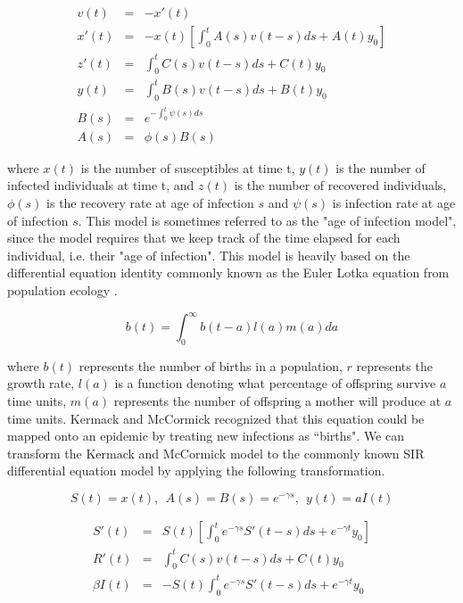 \documentclass{umassthesis}          %
\begin{document}
\begin{eqnarray}
  v(t) &=& -x'(t) \\ 
  x'(t) &=& -x(t)\left[ \int_0^t A(s) v(t-s)ds + A(t) y_0 \right] \\
  z'(t) &=& \int_0^t C(s)v(t-s)ds + C(t)y_0\\
  y(t) &=& \int_0^t B(s)v(t-s)ds + B(t) y_0\\
  B(s) &=& e^{-\int_0^t \psi(s)ds}\\
  A(s) &=& \phi(s)B(s)
\end{eqnarray}

where $x(t)$ is the number of susceptibles at time t, $y(t)$ is the number of infected individuals at time t, and $z(t)$ is the number of recovered individuals, $\phi(s)$ is the recovery rate at age of infection $s$ and $\psi(s)$ is infection rate at age of infection $s$. This model is sometimes referred to as the "age of infection model", since the model requires that we keep track of the time elapsed for each individual, i.e. their "age of infection". This model is heavily based on the differential equation identity commonly known as the Euler Lotka equation from population ecology \cite{wallinga2007generation}. 

\begin{equation}
  b(t) =\int_0^\infty b(t-a)l(a)m(a) da
\end{equation}

where $b(t)$ represents the number of births in a population, $r$ represents the growth rate, $l(a)$ is a function denoting what percentage of offspring survive $a$ time units, $m(a)$ represents the number of offspring a mother will produce at $a$ time units. Kermack and McCormick recognized that this equation could be mapped onto an epidemic by treating new infections as ``births".  We can transform the Kermack and McCormick model to the commonly known SIR differential equation model by applying the following transformation.

\begin{equation}
S(t) = x(t) , \ \ A(s)= B(s) = e^{-\gamma s}, \ \ y(t) =  aI(t)
\end{equation}


\begin{eqnarray}
  S'(t) &=& S(t)\left[ \int_0^t e^{-\gamma s}S'(t-s)ds + e^{-\gamma t} y_0 \right] \\
  R'(t) &=& \int_0^t C(s)v(t-s)ds + C(t)y_0\\
 \beta I (t) &=& -S(t)\int_0^t e^{-\gamma s}S'(t-s)ds + e^{-\gamma t}y_0\\
\end{eqnarray}
\end{document}
